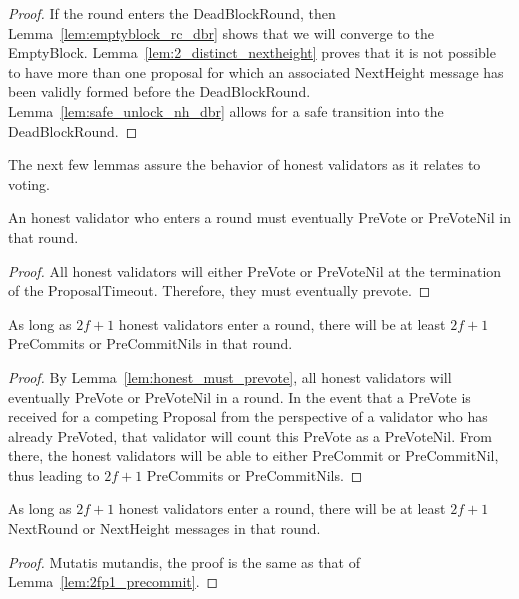 \begin{proof}
If the round enters the DeadBlockRound, then Lemma~\ref{lem:emptyblock_rc_dbr}
shows that we will converge to the EmptyBlock.
Lemma~\ref{lem:2_distinct_nextheight}
proves that it is not possible to have more than one proposal for which
an associated NextHeight message has been validly formed before the
DeadBlockRound.
Lemma~\ref{lem:safe_unlock_nh_dbr}
allows for a safe transition into the DeadBlockRound.
\end{proof}

The next few lemmas assure the behavior of honest validators as it relates to
voting.

\begin{lem}
\label{lem:honest_must_prevote}
An honest validator who enters a round must eventually PreVote or PreVoteNil in
that round.
\end{lem}

\begin{proof}
All honest validators will either PreVote or PreVoteNil at the termination of
the ProposalTimeout.
Therefore, they must eventually prevote.
\end{proof}

\begin{lem}
\label{lem:2fp1_precommit}
As long as $2f+1$ honest validators enter a round, there will be at least
$2f+1$ PreCommits or PreCommitNils in that round.
\end{lem}

\begin{proof}
By Lemma~\ref{lem:honest_must_prevote},
all honest validators will eventually PreVote or PreVoteNil in a round.
In the event that a PreVote is received for a competing Proposal from the
perspective of a validator who has already PreVoted, that validator will count
this PreVote as a PreVoteNil.
From there, the honest validators will be able to either PreCommit or
PreCommitNil, thus leading to $2f+1$ PreCommits or PreCommitNils.
\end{proof}

\begin{lem}
\label{lem:2fp1_nextround}
As long as $2f+1$ honest validators enter a round, there will be at least
$2f+1$ NextRound or NextHeight messages in that round.
\end{lem}

\begin{proof}
Mutatis mutandis, the proof is the same as that of
Lemma~\ref{lem:2fp1_precommit}.
\end{proof}

